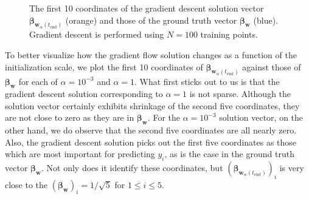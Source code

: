 \documentclass{article}
\begin{document}
\begin{figure}[H]
    \centering
    \hfill
    \caption{The first 10 coordinates of the gradient descent solution vector $\boldsymbol{\beta}_{\boldsymbol{w}_{\alpha}(t_{\text{end}})}$ (orange) and those of the ground truth vector $\boldsymbol{\beta}_{\boldsymbol{w}}$ (blue). Gradient descent is performed using $N=100$ training points.}\label{fig:solutionpts}
\end{figure}

To better visualize how the gradient flow solution changes as a function of the initialization scale, we plot the first 10 coordinates of $\boldsymbol{\beta}_{\boldsymbol{w}_{\alpha}(t_{\text{end}})}$ against those of $\boldsymbol{\beta}_{\boldsymbol{w}}$ for each of $\alpha = 10^{-3}$ and $\alpha = 1$. What first sticks out to us is that the gradient descent solution corresponding to $\alpha = 1$ is not sparse. Although the solution vector certainly exhibits shrinkage of the second five coordinates, they are not close to zero as they are in $\boldsymbol{\beta}_{\boldsymbol{w}}$. For the $\alpha = 10^{-3}$ solution vector, on the other hand, we do observe that the second five coordinates are all nearly zero. Also, the gradient descent solution picks out the first five coordinates as those which are most important for predicting $y_i$, as is the case in the ground truth vector $\boldsymbol{\beta}_{\boldsymbol{w}}$. Not only does it identify these coordinates, but $(\boldsymbol{\beta}_{\boldsymbol{w}_{\alpha}(t_{\text{end}})})_i$ is very close to the $(\boldsymbol{\beta}_{\boldsymbol{w}})_i = 1/\sqrt{5}$ for $1 \leq i \leq 5$. 
\end{document}
